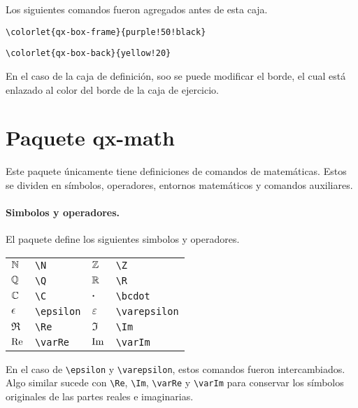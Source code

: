 \documentclass[11pt]{article}
\begin{document}

\begin{exercise}
  Los siguientes comandos fueron agregados antes de esta caja.
  
  \verb|\colorlet{qx-box-frame}{purple!50!black}|
  
  \verb|\colorlet{qx-box-back}{yellow!20}|
\end{exercise}

\begin{definition}
  En el caso de la caja de definición, soo se puede modificar el borde, el cual está enlazado al color del borde de la caja de ejercicio.
\end{definition}




\section{Paquete \textsf{qx-math}}

Este paquete únicamente tiene definiciones de comandos de matemáticas. Estos se dividen en símbolos, operadores, entornos matemáticos y comandos auxiliares.

\paragraph{Simbolos y operadores.} El paquete define los siguientes simbolos y operadores.
\begin{center}
\begin{tabular}{ll@{\qquad\qquad}ll}
  $\mathbb{N}$ & \verb|\N| & $\mathbb{Z}$ & \verb|\Z|  \\
  $\mathbb{Q}$ & \verb|\Q| & $\mathbb{R}$ & \verb|\R|  \\
  $\mathbb{C}$ & \verb|\C| & $\boldsymbol\cdot$ & \verb|\bcdot| \\
  $\epsilon$ & \verb|\epsilon| & $\varepsilon$ & \verb|\varepsilon| \\
  $\Re$ & \verb|\Re| & $\Im$ & \verb|\Im| \\
  $\operatorname{Re}$ & \verb|\varRe| & $\operatorname{Im}$ & \verb|\varIm|
\end{tabular}
\end{center}

En el caso de \verb|\epsilon| y \verb|\varepsilon|, estos comandos fueron intercambiados. Algo similar sucede con \verb|\Re|, \verb|\Im|, \verb|\varRe| y \verb|\varIm| para conservar los símbolos originales de las partes reales e imaginarias.
\end{document}

